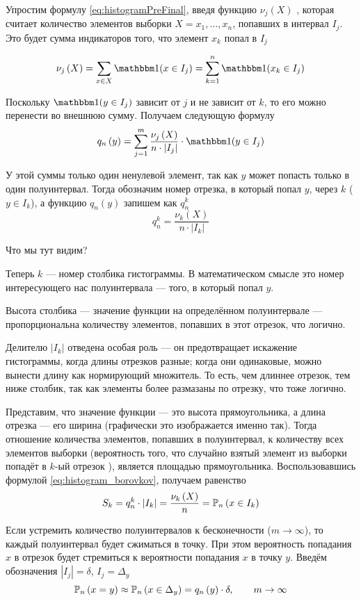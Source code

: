 Упростим формулу \eqref{eq:histogramPreFinal}, введя функцию
$\nu_j\left(X\right)$ \cite[стр.~68]{BorovkovMS},
которая считает количество элементов выборки $X=x_1, \dots, x_n$,
попавших в интервал $I_j$.
Это будет сумма индикаторов того, что элемент $x_k$ попал в $I_j$

$$\nu_j\left(X\right)
=\sum_{x\in X} \indicator{x\in I_j}
=\sum_{k=1}^n \indicator{x_k\in I_j}$$

Поскольку $\indicator{y\in I_j}$ зависит от $j$ и не зависит от $k$,
то его можно перенести во внешнюю сумму. Получаем следующую формулу
$$q_n\left(y\right)
=\sum_{j=1}^m \frac{\nu_j\left(X\right)}{n\cdot\left|I_j\right|}
  \cdot \indicator{y\in I_j}$$

У этой суммы только один ненулевой элемент,
так как $y$ может попасть только в один полуинтервал.
Тогда обозначим номер отрезка, в который попал $y$, через $k$ ($y\in I_k$),
а функцию $q_n\left(y\right)$ запишем как $q_n^k$
\begin{equation}\label{eq:histogram_borovkov}
  q_n^k = \frac{\nu_k\left(X\right)}{n\cdot\left|I_k\right|}
\end{equation}


Что мы тут видим?

Теперь $k$ --- номер столбика гистограммы. В математическом смысле это
номер интересующего нас полуинтервала --- того, в который попал $y$.

Высота столбика --- значение функции на определённом полуинтервале ---
пропорциональна количеству элементов, попавших в этот отрезок, что логично.

Делителю $\left|I_k\right|$ отведена особая роль --- он предотвращает
искажение гистограммы, когда длины отрезков разные; когда они одинаковые,
можно вынести длину как нормирующий множитель. То есть, чем длиннее отрезок,
тем ниже столбик, так как элементы более размазаны по отрезку, что тоже логично.

Представим, что значение функции --- это высота прямоугольника,
а длина отрезка --- его ширина (графически это изображается именно так).
Тогда отношение количества элементов, попавших в полуинтервал,
к количеству всех элементов выборки (вероятность того, что случайно взятый
элемент из выборки попадёт в $k$-ый отрезок \cite[стр.~24]{BorovkovMS}),
является площадью прямоугольника. Воспользовавшись формулой
\eqref{eq:histogram_borovkov}, получаем равенство
$$S_k
  = q_n^k \cdot \left| I_k \right|
  = \frac{\nu_k\left(X\right)}{n}=\mathbb{P}_n\left( x\in I_k \right)$$

Если устремить количество полуинтервалов к бесконечности ($m\to\infty$),
то каждый полуинтервал будет сжиматься в точку.
При этом вероятность попадания $x$ в отрезок будет стремиться
к вероятности попадания $x$ в точку $y$.
Введём обозначения $|I_j|=\delta$, $I_j=\Delta_y$
$$\mathbb{P}_n\left( x=y \right)
\approx\mathbb{P}_n\left( x\in\Delta_y \right)=q_n\left(y\right)\cdot\delta,
\qquad m\to\infty$$

